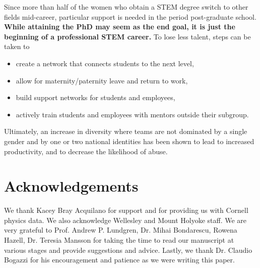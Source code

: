 \documentclass[utf8]{frontiersSCNS} %
\begin{document}
Since more than half of the women who obtain a STEM degree switch to other fields mid-career, particular support is needed in the period post-graduate school. {\bf While attaining the PhD may seem as the end goal, it is just the beginning of a professional STEM career.} To lose less talent, steps can be taken to
\begin{itemize}
\item create a network that connects students to the next level, \item allow for maternity/paternity leave and return to work, \item build support networks for students and employees,  
\item actively train students and employees with mentors outside their subgroup.
\end{itemize}
Ultimately, an increase in diversity where teams are not dominated by a single gender and by one or two national identities has been shown to lead to increased productivity, and to decrease the likelihood of abuse. 

\section*{Acknowledgements}
We thank Kacey Bray Acquilano for support and for providing us with Cornell physics data. We also acknowledge Wellesley and Mount Holyoke staff. We are very grateful to Prof. Andrew P. Lundgren, Dr. Mihai Bondarescu, Rowena Hazell, Dr. Teresia Mansson for taking the time to read our manuscript at various stages and provide suggestions and advice. Lastly, we thank Dr. Claudio Bogazzi for his encouragement and patience as we were writing this paper.


\end{document}
